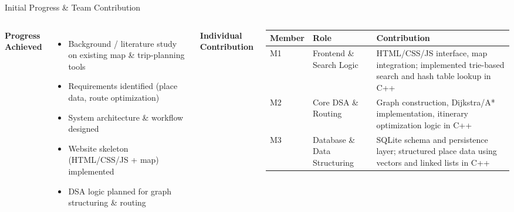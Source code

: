 \documentclass[aspectratio=169,10pt]{beamer}
\begin{document}
\begin{frame}{Initial Progress \& Team Contribution}
\begin{columns}[T,totalwidth=\textwidth]
\textbf{\color{GEUBlue}Progress Achieved}
\begin{itemize}\itemsep1pt
\item Background / literature study on existing map \& trip-planning tools
\item Requirements identified (place data, route optimization)
\item System architecture \& workflow designed
\item Website skeleton (HTML/CSS/JS + map) implemented
\item DSA logic planned for graph structuring \& routing
\end{itemize}
\textbf{\color{GEUBlue}Individual Contribution}
\vspace{1mm}
\scriptsize
\begin{tabularx}{\textwidth}{@{}p{1.8cm}p{2.0cm}X@{}}
\toprule
Member & Role & Contribution\\
\midrule
M1 & Frontend \& Search Logic & HTML/CSS/JS interface, map integration; implemented trie-based search and hash table lookup in C++\\
M2 & Core DSA \& Routing & Graph construction, Dijkstra/A* implementation, itinerary optimization logic in C++\\
M3 & Database \& Data Structuring & SQLite schema and persistence layer; structured place data using vectors and linked lists in C++\\
\bottomrule
\end{tabularx}
\end{columns}
\end{frame}
\end{document}
